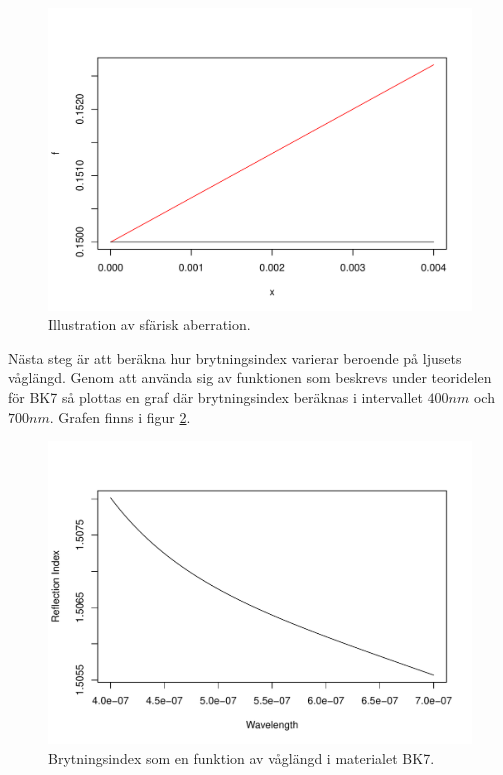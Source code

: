 \documentclass[12pt]{article}
\begin{document}
\begin{figure}[h!]
  \centering
    \includegraphics[scale=0.6]{para_approx.pdf}
	\caption{Illustration av sfärisk aberration.}
	\label{1a}
\end{figure} 

Nästa steg är att beräkna hur brytningsindex varierar beroende på ljusets våglängd. Genom att använda sig av funktionen som beskrevs under teoridelen för BK7 så plottas en graf där brytningsindex beräknas i intervallet $400 nm$ och $700 nm$. Grafen finns i figur \ref{1b}. 

\begin{figure}[h!]
  \centering
   \includegraphics[scale=0.6]{BK7_index.pdf}
	\caption{Brytningsindex som en funktion av våglängd i materialet BK7.}
	\label{1b}
\end{figure} 
\end{document}
